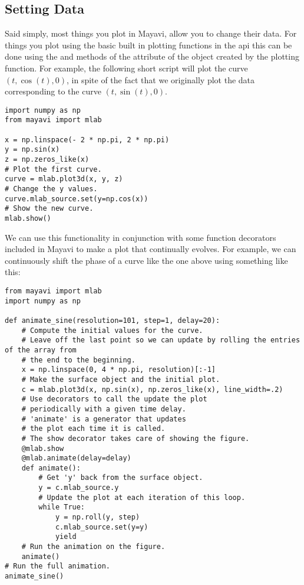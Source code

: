 \subsection*{Setting Data}
Said simply, most things you plot in Mayavi, allow you to change their data.
For things you plot using the basic built in plotting functions in the  api this can be done using the  and  methods of the  attribute of the object created by the plotting function.
For example, the following short script will plot the curve $(t, \cos(t), 0)$, in spite of the fact that we originally plot the data corresponding to the curve $(t, \sin(t), 0)$.
\begin{lstlisting}
import numpy as np
from mayavi import mlab

x = np.linspace(- 2 * np.pi, 2 * np.pi)
y = np.sin(x)
z = np.zeros_like(x)
# Plot the first curve.
curve = mlab.plot3d(x, y, z)
# Change the y values.
curve.mlab_source.set(y=np.cos(x))
# Show the new curve.
mlab.show()
\end{lstlisting}

We can use this functionality in conjunction with some function decorators included in Mayavi to make a plot that continually evolves.
For example, we can continuously shift the phase of a curve like the one above using something like this:
\begin{lstlisting}
from mayavi import mlab
import numpy as np

def animate_sine(resolution=101, step=1, delay=20):
    # Compute the initial values for the curve.
    # Leave off the last point so we can update by rolling the entries of the array from
    # the end to the beginning.
    x = np.linspace(0, 4 * np.pi, resolution)[:-1]
    # Make the surface object and the initial plot.
    c = mlab.plot3d(x, np.sin(x), np.zeros_like(x), line_width=.2)
    # Use decorators to call the update the plot
    # periodically with a given time delay.
    # 'animate' is a generator that updates
    # the plot each time it is called.
    # The show decorator takes care of showing the figure.
    @mlab.show
    @mlab.animate(delay=delay)
    def animate():
        # Get 'y' back from the surface object.
        y = c.mlab_source.y
        # Update the plot at each iteration of this loop.
        while True:
            y = np.roll(y, step)
            c.mlab_source.set(y=y)
            yield
    # Run the animation on the figure.
    animate()
# Run the full animation.
animate_sine()
\end{lstlisting}

